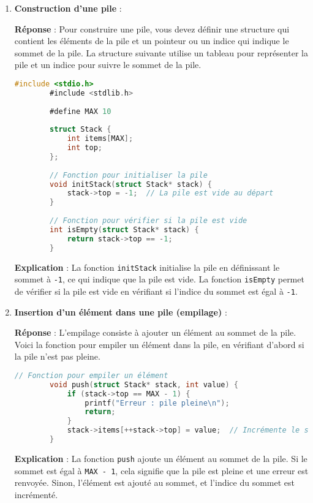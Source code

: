 \begin{enumerate}
	\item \textbf{Construction d'une pile} :
	
	\textbf{Réponse} :
	Pour construire une pile, vous devez définir une structure qui contient les éléments de la pile et un pointeur ou un indice qui indique le sommet de la pile. La structure suivante utilise un tableau pour représenter la pile et un indice pour suivre le sommet de la pile.
	
	\begin{lstlisting}[language=C]
		#include <stdio.h>
		#include <stdlib.h>
		
		#define MAX 10
		
		struct Stack {
			int items[MAX];
			int top;
		};
		
		// Fonction pour initialiser la pile
		void initStack(struct Stack* stack) {
			stack->top = -1;  // La pile est vide au départ
		}
		
		// Fonction pour vérifier si la pile est vide
		int isEmpty(struct Stack* stack) {
			return stack->top == -1;
		}
	\end{lstlisting}
	
	\textbf{Explication} :
	La fonction \texttt{initStack} initialise la pile en définissant le sommet à \texttt{-1}, ce qui indique que la pile est vide. La fonction \texttt{isEmpty} permet de vérifier si la pile est vide en vérifiant si l'indice du sommet est égal à \texttt{-1}.
	
	\item \textbf{Insertion d'un élément dans une pile (empilage)} :
	
	\textbf{Réponse} :
	L'empilage consiste à ajouter un élément au sommet de la pile. Voici la fonction pour empiler un élément dans la pile, en vérifiant d'abord si la pile n'est pas pleine.
	
	\begin{lstlisting}[language=C]
		// Fonction pour empiler un élément
		void push(struct Stack* stack, int value) {
			if (stack->top == MAX - 1) {
				printf("Erreur : pile pleine\n");
				return;
			}
			stack->items[++stack->top] = value;  // Incrémente le sommet puis ajoute l'élément
		}
	\end{lstlisting}
	
	\textbf{Explication} :
	La fonction \texttt{push} ajoute un élément au sommet de la pile. Si le sommet est égal à \texttt{MAX - 1}, cela signifie que la pile est pleine et une erreur est renvoyée. Sinon, l'élément est ajouté au sommet, et l'indice du sommet est incrémenté.
	

\end{enumerate}
